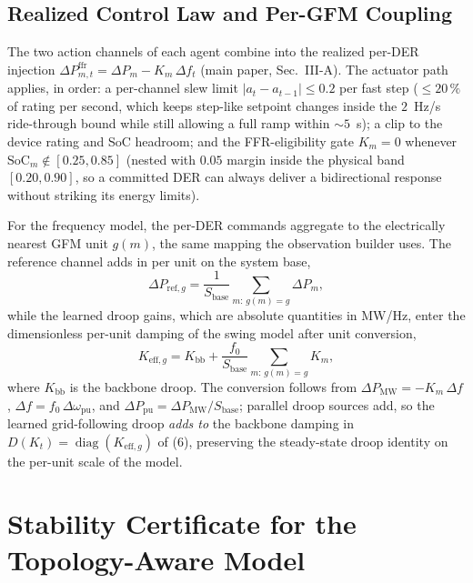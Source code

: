 \documentclass[lettersize,journal]{IEEEtran}
\begin{document}
\subsection{Realized Control Law and Per-GFM Coupling}
\label{supp:coupling}
The two action channels of each agent combine into the realized per-DER injection $\Delta P^{\mathrm{ffr}}_{m,t}=\Delta P_m-K_m\,\Delta f_t$ (main paper, Sec.~III-A). The actuator path applies, in order: a per-channel slew limit $|a_t-a_{t-1}|\le0.2$ per fast step ($\le20\,\%$ of rating per second, which keeps step-like setpoint changes inside the $2$~Hz/s ride-through bound while still allowing a full ramp within $\sim\!5$~s); a clip to the device rating and SoC headroom; and the FFR-eligibility gate $K_m=0$ whenever $\mathrm{SoC}_m\notin[0.25,0.85]$ (nested with $0.05$ margin inside the physical band $[0.20,0.90]$, so a committed DER can always deliver a bidirectional response without striking its energy limits).

For the frequency model, the per-DER commands aggregate to the electrically nearest GFM unit $g(m)$, the same mapping the observation builder uses. The reference channel adds in per unit on the system base,
\begin{equation}
  \Delta P_{\mathrm{ref},g}
   = \frac{1}{S_{\mathrm{base}}}\sum_{m:\,g(m)=g}\Delta P_m ,
  \label{eq:pref_agg}
\end{equation}
while the learned droop gains, which are absolute quantities in MW/Hz, enter the dimensionless per-unit damping of the swing model after unit conversion,
\begin{equation}
  K_{\mathrm{eff},g}
   = K_{\mathrm{bb}}
   + \frac{f_0}{S_{\mathrm{base}}}\sum_{m:\,g(m)=g} K_m ,
  \label{eq:kdroop_conv}
\end{equation}
where $K_{\mathrm{bb}}$ is the backbone droop. The conversion follows from $\Delta P_{\mathrm{MW}}=-K_m\,\Delta f$, $\Delta f=f_0\,\Delta\omega_{\mathrm{pu}}$, and $\Delta P_{\mathrm{pu}}=\Delta P_{\mathrm{MW}}/S_{\mathrm{base}}$; parallel droop sources add, so the learned grid-following droop \emph{adds to} the backbone damping in $D(K_t)=\operatorname{diag}(K_{\mathrm{eff},g})$ of (6), preserving the steady-state droop identity on the per-unit scale of the model.

\section{Stability Certificate for the Topology-Aware Model}
\label{supp:lyapunov}
\end{document}
